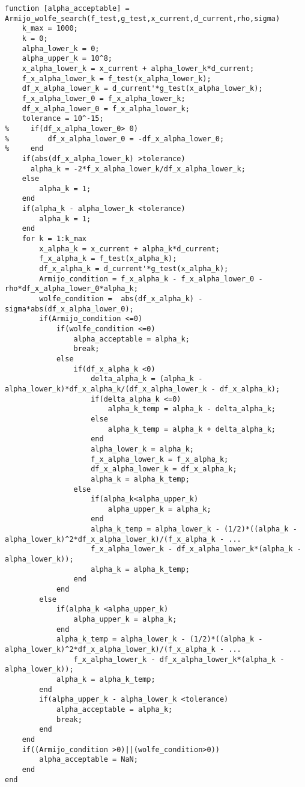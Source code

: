 \newpage
\begin{lstlisting}[style=matlab, title="强wolfe方法代码"]
function [alpha_acceptable] = Armijo_wolfe_search(f_test,g_test,x_current,d_current,rho,sigma)
    k_max = 1000;
    k = 0;
    alpha_lower_k = 0;
    alpha_upper_k = 10^8;
    x_alpha_lower_k = x_current + alpha_lower_k*d_current;
    f_x_alpha_lower_k = f_test(x_alpha_lower_k);
    df_x_alpha_lower_k = d_current'*g_test(x_alpha_lower_k);
    f_x_alpha_lower_0 = f_x_alpha_lower_k;
    df_x_alpha_lower_0 = f_x_alpha_lower_k;
    tolerance = 10^-15;
%     if(df_x_alpha_lower_0> 0)
%         df_x_alpha_lower_0 = -df_x_alpha_lower_0;
%     end
    if(abs(df_x_alpha_lower_k) >tolerance)
      alpha_k = -2*f_x_alpha_lower_k/df_x_alpha_lower_k;
    else
        alpha_k = 1;
    end
    if(alpha_k - alpha_lower_k <tolerance)
        alpha_k = 1;
    end
    for k = 1:k_max
        x_alpha_k = x_current + alpha_k*d_current;
        f_x_alpha_k = f_test(x_alpha_k);
        df_x_alpha_k = d_current'*g_test(x_alpha_k);
        Armijo_condition = f_x_alpha_k - f_x_alpha_lower_0 - rho*df_x_alpha_lower_0*alpha_k;
        wolfe_condition =  abs(df_x_alpha_k) - sigma*abs(df_x_alpha_lower_0);
        if(Armijo_condition <=0)
            if(wolfe_condition <=0)
                alpha_acceptable = alpha_k;
                break;
            else
                if(df_x_alpha_k <0)
                    delta_alpha_k = (alpha_k - alpha_lower_k)*df_x_alpha_k/(df_x_alpha_lower_k - df_x_alpha_k);
                    if(delta_alpha_k <=0)
                        alpha_k_temp = alpha_k - delta_alpha_k;
                    else
                        alpha_k_temp = alpha_k + delta_alpha_k;
                    end
                    alpha_lower_k = alpha_k;
                    f_x_alpha_lower_k = f_x_alpha_k;
                    df_x_alpha_lower_k = df_x_alpha_k;
                    alpha_k = alpha_k_temp;
                else
                    if(alpha_k<alpha_upper_k)
                        alpha_upper_k = alpha_k;
                    end
                    alpha_k_temp = alpha_lower_k - (1/2)*((alpha_k - alpha_lower_k)^2*df_x_alpha_lower_k)/(f_x_alpha_k - ...
                    f_x_alpha_lower_k - df_x_alpha_lower_k*(alpha_k - alpha_lower_k));
                    alpha_k = alpha_k_temp;
                end
            end
        else
            if(alpha_k <alpha_upper_k)
                alpha_upper_k = alpha_k;
            end
            alpha_k_temp = alpha_lower_k - (1/2)*((alpha_k - alpha_lower_k)^2*df_x_alpha_lower_k)/(f_x_alpha_k - ...
                f_x_alpha_lower_k - df_x_alpha_lower_k*(alpha_k - alpha_lower_k));
            alpha_k = alpha_k_temp;
        end
        if(alpha_upper_k - alpha_lower_k <tolerance)
            alpha_acceptable = alpha_k;
            break;
        end
    end
    if((Armijo_condition >0)||(wolfe_condition>0))
        alpha_acceptable = NaN;
    end
end
\end{lstlisting}